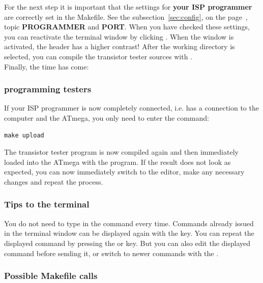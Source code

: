 For the next step it is important that the settings for
\textbf {your ISP programmer} are correctly set in the Makefile.
See the subsection~\ref{sec:config}, on the page~\pageref{sec:config-Prog},
topic \textbf{PROGRAMMER} and \textbf{PORT}.
When you have checked these settings, you can reactivate the terminal window by clicking \LMB.
When the window is activated, the header has a higher contrast!
After the working directory is selected, you can compile the
transistor tester sources with .\\
Finally, the time has come:
\subsubsection{programming testers}
If your ISP programmer is now completely connected,
i.e. has a connection to the computer and the ATmega, you only need to enter the command:
\begin{large} \vspace{-0.4em} \begin{verbatim}
make upload
\end{verbatim} \end{large}
The transistor tester program is now compiled again and then immediately loaded
into the ATmega with the  program.
If the result does not look as expected, you can now immediately switch to the  editor,
make any necessary changes and repeat the process.
\subsubsection{Tips to the terminal} 
You do not need to type in the command every time.
Commands already issued in the terminal window can be displayed again with
the \keys{$\uparrow$} key.
You can repeat the displayed command by pressing the \keys{\enter} or \keys{\return} key.
But you can also edit the displayed command before sending it,
or switch to newer commands with the \keys{$\downarrow$}.
\subsubsection{Possible Makefile calls} 

